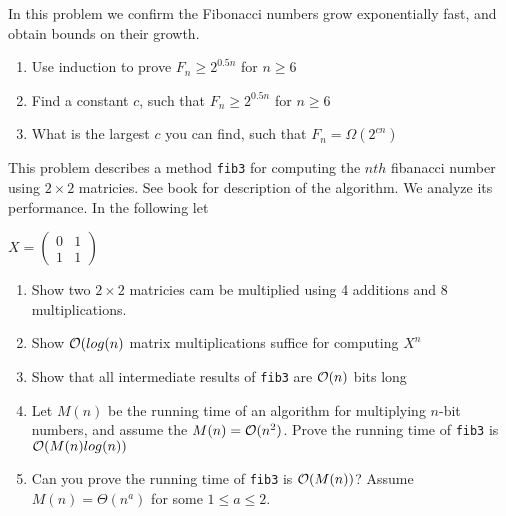 \documentclass{article}
\begin{document}
{In this problem we confirm the Fibonacci numbers grow exponentially fast, and obtain bounds on their growth.

\begin{enumerate}[label=(\alph*)]
  \item Use induction to prove $F_n\geq 2^{0.5n}$ for $n\geq 6$
  \item Find a constant $c$, such that $F_n\geq 2^{0.5n}$ for $n\geq 6$
  \item What is the largest $c$ you can find, such that $F_n=\Omega(2^{cn})$
\end{enumerate}
}
{}

{This problem describes a method \texttt{fib3} for computing the $nth$ fibanacci number using $2\times 2$ matricies.  See book for description of the algorithm.  We analyze its performance.  In the following let 

$X=\begin{pmatrix}
0 & 1 \\
1 & 1 
\end{pmatrix}
$
\begin{enumerate}[label=(\alph*)]
  \item Show two $2\times 2$ matricies cam be multiplied using 4 additions and 8 multiplications.
  \item Show $\mathcal{O}(log(n)$ matrix multiplications suffice for computing $X^n$
  \item Show that all intermediate results of \texttt{fib3} are $\mathcal{O}(n)$ bits long
  \item Let $M(n)$ be the running time of an algorithm for multiplying $n$-bit numbers, and assume the $M(n)=\mathcal{O}(n^2)$.  Prove the running time of \texttt{fib3} is $\mathcal{O}(M(n)log(n))$
  \item Can you prove the running time of \texttt{fib3} is $\mathcal{O}(M(n))$?  Assume $M(n)= \Theta (n^a)$ for some $1\leq a\leq2$.
\end{enumerate}
}
{}
\end{document}
